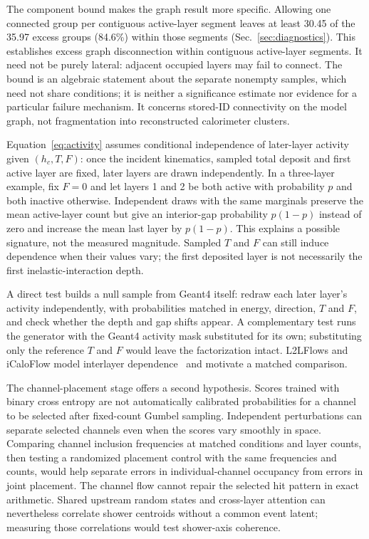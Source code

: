 \documentclass[10pt]{article}
\begin{document}
The component bound makes the graph result more specific. Allowing one connected group per contiguous active-layer segment leaves at least 30.45 of the 35.97 excess groups (84.6\%) within those segments (Sec.~\ref{sec:diagnostics}). This establishes excess graph disconnection within contiguous active-layer segments. It need not be purely lateral: adjacent occupied layers may fail to connect. The bound is an algebraic statement about the separate nonempty samples, which need not share conditions; it is neither a significance estimate nor evidence for a particular failure mechanism. It concerns stored-ID connectivity on the model graph, not fragmentation into reconstructed calorimeter clusters.

Equation~\eqref{eq:activity} assumes conditional independence of later-layer activity given $(h_c,T,F)$: once the incident kinematics, sampled total deposit and first active layer are fixed, later layers are drawn independently. In a three-layer example, fix $F=0$ and let layers 1 and 2 be both active with probability $p$ and both inactive otherwise. Independent draws with the same marginals preserve the mean active-layer count but give an interior-gap probability $p(1-p)$ instead of zero and increase the mean last layer by $p(1-p)$. This explains a possible signature, not the measured magnitude. Sampled $T$ and $F$ can still induce dependence when their values vary; the first deposited layer is not necessarily the first inelastic-interaction depth.

A direct test builds a null sample from Geant4 itself: redraw each later layer's activity independently, with probabilities matched in energy, direction, $T$ and $F$, and check whether the depth and gap shifts appear. A complementary test runs the generator with the Geant4 activity mask substituted for its own; substituting only the reference $T$ and $F$ would leave the factorization intact. L2LFlows and iCaloFlow model interlayer dependence~\cite{l2lflows,icaloflow} and motivate a matched comparison.

The channel-placement stage offers a second hypothesis. Scores trained with binary cross entropy are not automatically calibrated probabilities for a channel to be selected after fixed-count Gumbel sampling. Independent perturbations can separate selected channels even when the scores vary smoothly in space. Comparing channel inclusion frequencies at matched conditions and layer counts, then testing a randomized placement control with the same frequencies and counts, would help separate errors in individual-channel occupancy from errors in joint placement. The channel flow cannot repair the selected hit pattern in exact arithmetic. Shared upstream random states and cross-layer attention can nevertheless correlate shower centroids without a common event latent; measuring those correlations would test shower-axis coherence.
\end{document}
